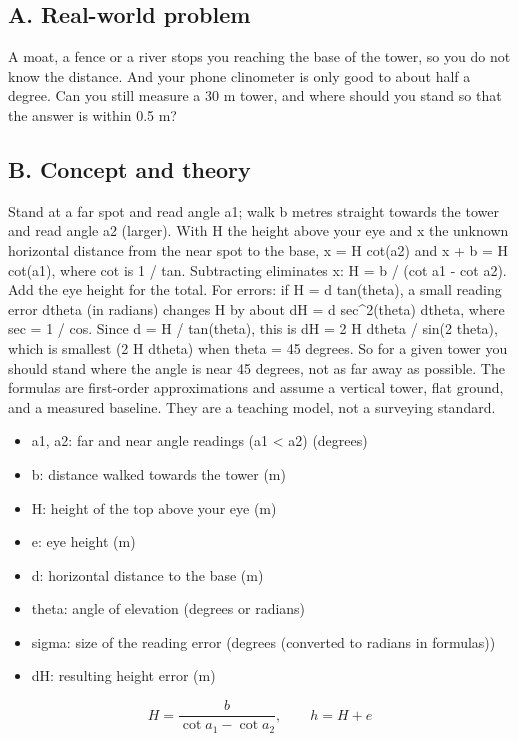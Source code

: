 \documentclass[11pt,a4paper]{article}
\begin{document}
\subsection*{A. Real-world problem}
A moat, a fence or a river stops you reaching the base of the tower, so you do not know the distance. And your phone clinometer is only good to about half a degree. Can you still measure a 30 m tower, and where should you stand so that the answer is within 0.5 m?

\subsection*{B. Concept and theory}
Stand at a far spot and read angle a1; walk b metres straight towards the tower and read angle a2 (larger). With H the height above your eye and x the unknown horizontal distance from the near spot to the base, x = H cot(a2) and x + b = H cot(a1), where cot is 1 / tan. Subtracting eliminates x: H = b / (cot a1 - cot a2). Add the eye height for the total. For errors: if H = d tan(theta), a small reading error dtheta (in radians) changes H by about dH = d sec\textasciicircum{}2(theta) dtheta, where sec = 1 / cos. Since d = H / tan(theta), this is dH = 2 H dtheta / sin(2 theta), which is smallest (2 H dtheta) when theta = 45 degrees. So for a given tower you should stand where the angle is near 45 degrees, not as far away as possible. The formulas are first-order approximations and assume a vertical tower, flat ground, and a measured baseline. They are a teaching model, not a surveying standard.

\begin{itemize}[nosep]
\item a1, a2: far and near angle readings (a1 \textless{} a2) (degrees)
\item b: distance walked towards the tower (m)
\item H: height of the top above your eye (m)
\item e: eye height (m)
\item d: horizontal distance to the base (m)
\item theta: angle of elevation (degrees or radians)
\item sigma: size of the reading error (degrees (converted to radians in formulas))
\item dH: resulting height error (m)
\end{itemize}

\begin{equation*}
H=\frac{b}{\cot a_1-\cot a_2},\qquad h=H+e
\end{equation*}
\end{document}
